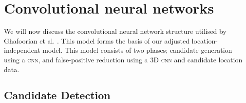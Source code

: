 %
%
%
%
%
%


\section{Convolutional neural networks}\label{litrev-cnn}

We will now discuss the convolutional neural network structure utilised by Ghafoorian et al. \cite{GhafoorianM.2017Dml3}. This model forms the basis of our adjusted location-independent model. This model consists of two phases; candidate generation using a \textsc{cnn}, and false-positive reduction using a 3D \textsc{cnn} and candidate location data.

\subsection*{Candidate Detection}


